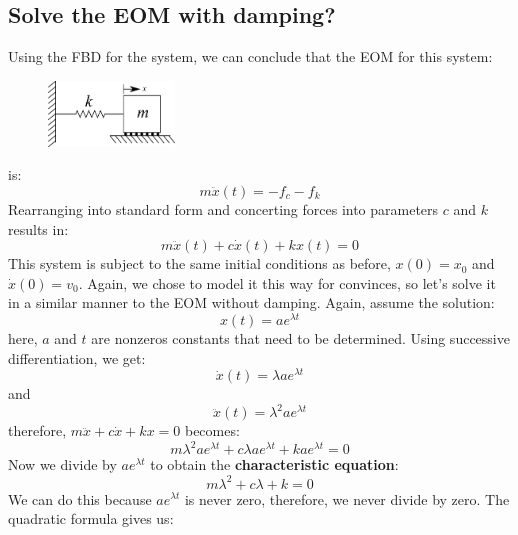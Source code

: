 \documentclass[12pt,a4paper]{article}
\begin{document}
		\subsection*{Solve the EOM with damping?}
					
			Using the FBD for the system, we can conclude that the EOM for this system:
			\begin{figure}[H]
				\centering
				\includegraphics[width=0.3\textwidth]{../../Figures/1-DOF-mass_horizontal.png}
			\end{figure}			
			is:
			\begin{equation}
				m\ddot{x}(t) = - f_c - f_k
			\end{equation}
			Rearranging into standard form and concerting forces into parameters $c$ and $k$ results in:
			\begin{equation}
				m\ddot{x}(t) + c \dot{x}(t) + kx(t) = 0
			\end{equation}
			This system is subject to the same initial conditions as before, $x(0) = x_0$ and $\dot{x}(0) = v_0$. Again, we chose to model it this way for convinces, so let's solve it in a similar manner to the EOM without damping. Again, assume the solution:
			\begin{equation}
				x(t) = ae^{\lambda t}
			\end{equation}
			here, $a$ and $t$ are nonzeros constants that need to be determined.  Using successive differentiation, we get:
			\begin{equation}
				\dot{x}(t) = \lambda ae^{\lambda t}
			\end{equation}
			and 
			\begin{equation}
				\ddot{x}(t) = \lambda^2 ae^{\lambda t}
			\end{equation}
			therefore, $m\ddot{x} + c\dot{x} + kx = 0$ becomes:
			\begin{equation}
				m \lambda^2 ae^{\lambda t}  +c\lambda ae^{\lambda t} + k ae^{\lambda t} = 0
			\end{equation}
			Now we divide by $ae^{\lambda t}$ to obtain the \textbf{characteristic equation}:
			\begin{equation}
				m \lambda^2 + c\lambda + k = 0
			\end{equation}
			We can do this because $ae^{\lambda t}$ is never zero, therefore, we never divide by zero. The quadratic formula gives us:
\end{document}
